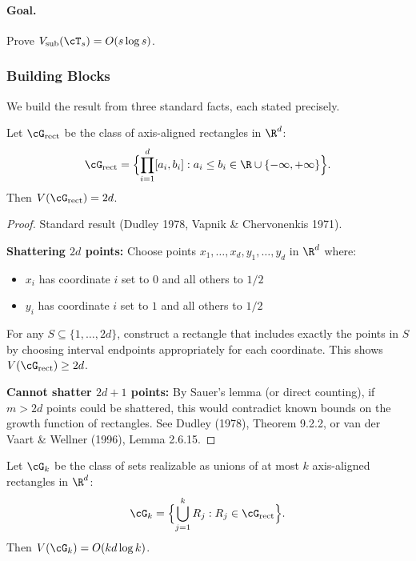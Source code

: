 \paragraph{Goal.}
Prove $V_{\text{sub}}(\cT_s) = O(s \log s)$.

\subsubsection*{Building Blocks}

We build the result from three standard facts, each stated precisely.

\begin{lemma}
\label{lem:vc-rect}
Let $\cG_{\text{rect}}$ be the class of axis-aligned rectangles in $\R^d$:
\[
\cG_{\text{rect}} = \Bigl\{ \prod_{i=1}^d [a_i, b_i] : a_i \le b_i \in \R \cup \{-\infty, +\infty\} \Bigr\}.
\]
Then $V(\cG_{\text{rect}}) = 2d$.
\end{lemma}

\begin{proof}
Standard result (Dudley 1978, Vapnik \& Chervonenkis 1971).

\textbf{Shattering $2d$ points:} Choose points $x_1, \ldots, x_d, y_1, \ldots, y_d$ in $\R^d$ where:
\begin{itemize}
\item $x_i$ has coordinate $i$ set to $0$ and all others to $1/2$
\item $y_i$ has coordinate $i$ set to $1$ and all others to $1/2$
\end{itemize}
For any $S \subseteq \{1,\ldots,2d\}$, construct a rectangle that includes exactly the points in $S$ by choosing interval endpoints appropriately for each coordinate. This shows $V(\cG_{\text{rect}}) \ge 2d$.

\textbf{Cannot shatter $2d+1$ points:} By Sauer's lemma (or direct counting), if $m > 2d$ points could be shattered, this would contradict known bounds on the growth function of rectangles. See Dudley (1978), Theorem 9.2.2, or van der Vaart \& Wellner (1996), Lemma 2.6.15.
\end{proof}

\begin{lemma}
\label{lem:vc-union}
Let $\cG_k$ be the class of sets realizable as unions of at most $k$ axis-aligned rectangles in $\R^d$:
\[
\cG_k = \Bigl\{ \bigcup_{j=1}^k R_j : R_j \in \cG_{\text{rect}} \Bigr\}.
\]
Then $V(\cG_k) = O(kd \log k)$.
\end{lemma}

